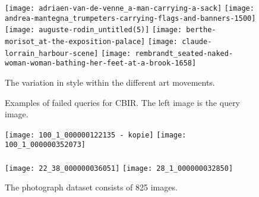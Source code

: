\begin{figure}
    \centering
    {
        \texttt{[image: adriaen-van-de-venne\_a-man-carrying-a-sack]}%
        \hspace{0.1in}
        \texttt{[image: andrea-mantegna\_trumpeters-carrying-flags-and-banners-1500]}%
        \hspace{0.1in}
        \texttt{[image: auguste-rodin\_untitled(5)]}%
        \vspace{0.1in}
    }
    {%
        \texttt{[image: berthe-morisot\_at-the-exposition-palace]}%
        \hspace{0.1in}
        \texttt{[image: claude-lorrain\_harbour-scene]}%
        \hspace{0.1in}
        \texttt{[image: rembrandt\_seated-naked-woman-woman-bathing-her-feet-at-a-brook-1658]}%
    }
    \caption{
        The variation in style within the different art movements.
    }
    \label{fig:wikiart_shortcomings_style}
\end{figure}
\begin{figure}
    \centering
    \caption{
        Examples of failed queries for CBIR. The left image is the query image.
    }
    \label{fig:cbir_failed_query}
\end{figure}
\begin{figure}
	\centering
    {
        \texttt{[image: 100\_1\_000000122135 - kopie]}
        \texttt{[image: 100\_1\_000000352073]}\\
    }
    {
        \\
        \texttt{[image: 22\_38\_000000036051]}
        \texttt{[image: 28\_1\_000000032850]}
    }
	\caption{The photograph dataset consists of 825 images.}
	\label{fig:photograph_style_transfer_dataset}
\end{figure}
